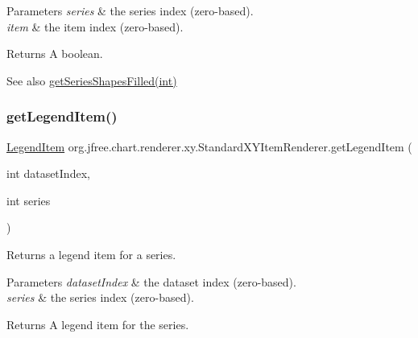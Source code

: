 \begin{DoxyParams}{Parameters}
{\em series} & the series index (zero-\/based). \\
\hline
{\em item} & the item index (zero-\/based).\\
\hline
\end{DoxyParams}
\begin{DoxyReturn}{Returns}
A boolean.
\end{DoxyReturn}
\begin{DoxySeeAlso}{See also}
\mbox{\hyperlink{classorg_1_1jfree_1_1chart_1_1renderer_1_1xy_1_1_standard_x_y_item_renderer_ae5cd12f33b9d935c2536456218d71dcb}{get\+Series\+Shapes\+Filled(int)}} 
\end{DoxySeeAlso}
\mbox{\label{classorg_1_1jfree_1_1chart_1_1renderer_1_1xy_1_1_standard_x_y_item_renderer_a13ddb95fcb4139f2e760f5f73d5ddcbf}} 
\subsubsection{\texorpdfstring{get\+Legend\+Item()}{getLegendItem()}}
{\footnotesize\ttfamily \mbox{\hyperlink{classorg_1_1jfree_1_1chart_1_1_legend_item}{Legend\+Item}} org.\+jfree.\+chart.\+renderer.\+xy.\+Standard\+X\+Y\+Item\+Renderer.\+get\+Legend\+Item (\begin{DoxyParamCaption}\item[{int}]{dataset\+Index,  }\item[{int}]{series }\end{DoxyParamCaption})}

Returns a legend item for a series.


\begin{DoxyParams}{Parameters}
{\em dataset\+Index} & the dataset index (zero-\/based). \\
\hline
{\em series} & the series index (zero-\/based).\\
\hline
\end{DoxyParams}
\begin{DoxyReturn}{Returns}
A legend item for the series. 
\end{DoxyReturn}



